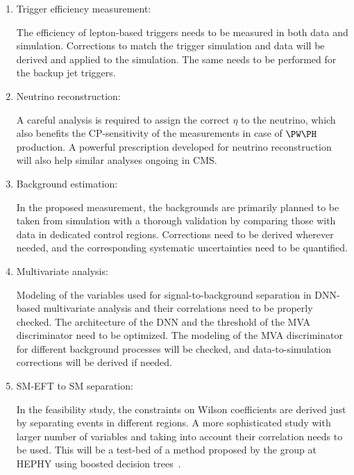 \documentclass[a4paper,11pt]{article}
\begin{document}
{\begin{enumerate}
The threshold on the DNN-based \PH tagging condition needs to be optimized since this is required for signal-to-background separation. 
Correction factors need to be appropriately calculated to match the tagging efficiency in data and simulation.

\item Trigger efficiency measurement:

The efficiency of lepton-based triggers needs to be measured in both data and simulation. 
Corrections to match the trigger simulation and data will be derived and applied to the simulation. 
The same needs to be performed for the backup jet triggers. 

\item Neutrino reconstruction:

A careful analysis is required to assign the correct $\eta$ to the neutrino, which also benefits the CP-sensitivity of the measurements in case of $\PW\PH$ production. 
A powerful prescription developed for neutrino reconstruction will also help similar analyses ongoing in CMS. 

\item Background estimation:

In the proposed measurement, the backgrounds are primarily planned to be taken from simulation with a thorough validation by comparing those with data in dedicated control regions. 
Corrections need to be derived wherever needed, and the corresponding systematic uncertainties need to be quantified.   

\item Multivariate analysis: 

Modeling of the variables used for signal-to-background separation in DNN-based multivariate analysis and their correlations need to be properly checked. 
The architecture of the DNN and the threshold of the MVA discriminator need to be optimized. 
The modeling of the MVA discriminator for different background processes will be checked, 
and data-to-simulation corrections will be derived if needed. 

\item SM-EFT to SM separation: 

In the feasibility study, the constraints on Wilson coefficients are derived just by separating events in different regions. A more sophisticated study with larger number of variables and taking into account their correlation needs to be used. 
This will be a test-bed of a method proposed by the group at HEPHY using boosted decision trees~\cite{Chatterjee:2021nms}. 


\end{enumerate}}
\end{document}
